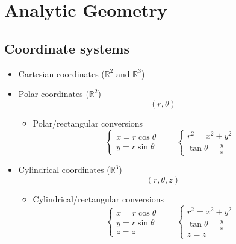 \section{Analytic Geometry}

\subsection{Coordinate systems}
	\begin{itemize}
		\item Cartesian coordinates ($\mathbb{R}^2$ and $\mathbb{R}^3$)
		\item Polar coordinates ($\mathbb{R}^2$)
			\begin{equation}
				(r, \theta)
			\end{equation}
			\begin{itemize}
				\item Polar/rectangular conversions
					\begin{equation}
						\begin{cases}
							x = r \cos \theta \\
							y = r \sin \theta
						\end{cases} \qquad \begin{cases}
							r^2 = x^2 + y^2 \\
							\tan \theta = \frac{y}{x}
						\end{cases}
					\end{equation}
			\end{itemize}
		\item Cylindrical coordinates ($\mathbb{R}^3$)
			\begin{equation}
				(r, \theta, z)
			\end{equation}
			\begin{itemize}
				\item Cylindrical/rectangular conversions
					\begin{equation}
						\begin{cases}
							x = r \cos \theta \\
							y = r \sin \theta \\
							z = z
						\end{cases} \qquad \begin{cases}
							r^2 = x^2 + y^2 \\
							\tan \theta = \frac{y}{x} \\
							z = z
						\end{cases}
					\end{equation}
			\end{itemize}

\end{itemize}
